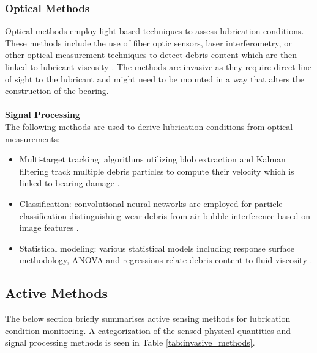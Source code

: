 \subsubsection{Optical Methods}
Optical methods employ light-based techniques to assess lubrication conditions. These methods include the use of fiber optic sensors, laser interferometry, or other optical measurement techniques to detect debris content which are then linked to lubricant viscosity \cite{shang_comprehensive_2024} \cite{maruyama_lubrication_2019} \cite{dai_situ_2024}. The methods are invasive as they require direct line of sight to the lubricant and might need to be mounted in a way that alters the construction of the bearing.
\\\\
\textbf{Signal Processing}\\
The following methods are used to derive lubrication conditions from optical measurements:
\begin{itemize}
    \item Multi-target tracking: algorithms utilizing blob extraction and Kalman filtering track multiple debris particles to compute their velocity which is linked to bearing damage \cite{liu_oil_2022}.
    \item Classification: convolutional neural networks are employed for particle classification distinguishing wear debris from air bubble interference based on image features \cite{wang_online_2022}.
    \item Statistical modeling: various statistical models including response surface methodology, ANOVA and regressions relate debris content to fluid viscosity \cite{liu_oil_2022}.
\end{itemize}

\subsection{Active Methods}
The below section briefly summarises active sensing methods for lubrication condition monitoring. A categorization of the sensed physical quantities and signal processing methods is seen in Table \ref{tab:invasive_methods}.

